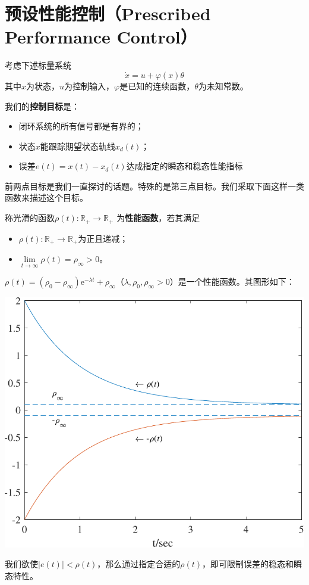 \section{预设性能控制（Prescribed Performance Control）}\label{4Fref}

考虑下述标量系统
\begin{equation*}
    \dot{x} = u + \varphi(x)\theta
\end{equation*}
其中$x$为状态，$u$为控制输入，$\varphi$是已知的连续函数，$\theta$为未知常数。

我们的{\bf 控制目标}是：
\begin{itemize}[leftmargin=1em]
    \item 闭环系统的所有信号都是有界的；
    \item 状态$x$能跟踪期望状态轨线$x_d(t)$；
    \item 误差$e(t)=x(t)-x_d(t)$达成指定的瞬态和稳态性能指标
\end{itemize}

前两点目标是我们一直探讨的话题。特殊的是第三点目标。我们采取下面这样一类函数来描述这个目标。
\begin{definition}\label{performance_func}
   称光滑的函数$\rho(t):\mathbb{R}_+\to\mathbb{R}_+$
   为{\bf 性能函数}，若其满足
   \begin{itemize}[leftmargin=1em]
    \item $\rho(t):\mathbb{R}_+\to\mathbb{R}_+$为正且递减；
    \item $\lim\limits_{t\to\infty}\rho(t)=\rho_\infty>0$。
\end{itemize}
\end{definition}
\begin{example}[性能函数]
   $\rho(t)=(\rho_0-\rho_{\infty})\mathrm{e}^{-\lambda t}+\rho_\infty$（$\lambda,\rho_0,\rho_{\infty}>0$）是一个性能函数。其图形如下：
   \begin{center}
       \includegraphics[scale=0.6]{figure/adaptive/p.pdf}
       \captionsetup{hypcap=false}
   \end{center}
\end{example}
我们欲使$|e(t)|<\rho(t)$，那么通过指定合适的$\rho(t)$，即可限制误差的稳态和瞬态特性。

